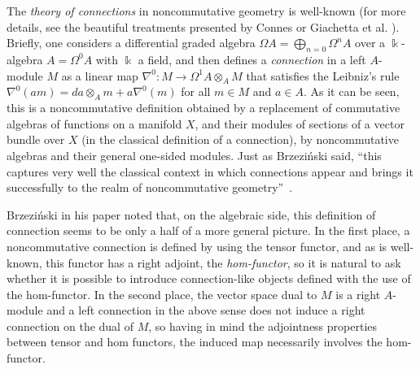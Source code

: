 \documentclass{amsart}
\theoremstyle{definition}
\theoremstyle{remark}
\numberwithin{equation}{section}
\begin{document}
The {\em theory of connections} in noncommutative geometry is well-known (for more details, see the beautiful treatments presented by Connes \cite{Connes1994} or Giachetta et al. \cite{Giachettaetal2005}). Briefly, one considers a differential graded algebra $\Omega A = \bigoplus\limits_{n = 0} \Omega^{n} A$ over a $\Bbbk$-algebra $A = \Omega^{0} A$ with $\Bbbk$ a field, and then defines a {\em connection} in a left $A$-module $M$ as a linear map $\nabla^{0} : M \to \Omega^{1} A \otimes_A M$ that satisfies the Leibniz's rule $\nabla^0(am) = da \otimes_A m + a\nabla^{0}(m)$ for all $m\in M$ and $a \in A$. As it can be seen, this is a noncommutative definition obtained by a replacement of commutative algebras of functions on a manifold $X$, and their modules of sections of a vector bundle over $X$ (in the classical definition of a connection), by noncommutative algebras and their general one-sided modules. Just as Brzezi{\'n}ski said, \textquotedblleft this captures very well the classical context in which connections appear and brings it successfully to the realm of noncommutative geometry\textquotedblright\ \cite[p. 557]{Brzezinski2008}.

Brzezi{\'n}ski in his paper noted that, on the algebraic side, this definition of connection seems to be only a half of a more general picture. In the first place, a noncommutative connection is defined by using the tensor functor, and as is well-known, this functor has a right adjoint, the {\em hom-functor}, so it is natural to ask whether it is possible to introduce connection-like objects defined with the use of the hom-functor. In the second place, the vector space dual to $M$ is a right $A$-module and a left connection in the above sense does not induce a right connection on the dual of $M$, so having in mind the adjointness properties between tensor and hom functors, the induced map necessarily involves the hom-functor. 
\end{document}
